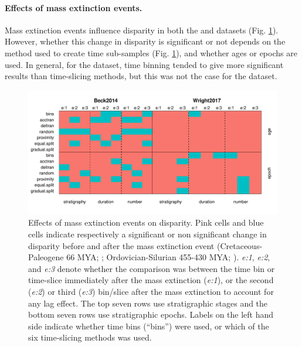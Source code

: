 \documentclass[12pt,a4paper]{article}
\begin{document}

\paragraph{Effects of mass extinction events.}
Mass extinction events influence disparity in both the \cite{beckancient2014} and \cite{wright2017bayesian} datasets (Fig. \ref{figure:extinction1}).
However, whether this change in disparity is significant or not depends on the method used to create time sub-samples (Fig. \ref{figure:extinction1}), and whether ages or epochs are used. 
In general, for the \cite{beckancient2014} dataset, time binning tended to give more significant results than time-slicing methods, but this was not the case for the \cite{wright2017bayesian} dataset.

\begin{figure}[!htbp]
    \centering
    \includegraphics[width=1\linewidth, height=1\textheight, keepaspectratio]{figures/Figure4-fig-extinction-effect.pdf}
    \caption[Extinction example datasets.]
    {Effects of mass extinction events on disparity.
    Pink cells and blue cells indicate respectively a significant or non significant change in disparity before and after the mass extinction event (Cretaceous-Paleogene 66 MYA; \citealt{beckancient2014}; Ordovician-Silurian 455-430 MYA; \citealt{wright2017bayesian}).
    \textit{e:1}, \textit{e:2}, and \textit{e:3} denote whether the comparison was between the time bin or time-slice immediately after the mass extinction (\textit{e:1}), or the second (\textit{e:2}) or third (\textit{e:3}) bin/slice after the mass extinction to account for any lag effect.
    The top seven rows use stratigraphic stages and the bottom seven rows use stratigraphic epochs.
    Labels on the left hand side indicate whether time bins (``bins'') were used, or which of the six time-slicing methods was used.}
    \label{figure:extinction1}
\end{figure}
\end{document}

